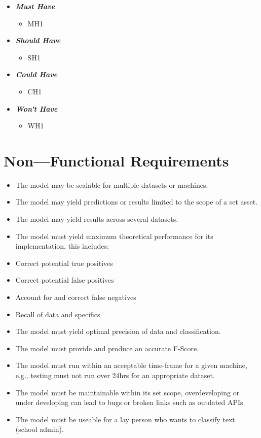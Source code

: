 \begin{itemize}
    \item \textbf{\textit{Must Have}}
        \begin{itemize}\label{FMH}
            \item MH1
        \end{itemize}
    \item \textbf{\textit{Should Have}}
        \begin{itemize}\label{FSH}
            \item SH1
        \end{itemize}
    \item \textbf{\textit{Could Have}}
        \begin{itemize}\label{FCH}
            \item CH1
        \end{itemize}
    \item \textbf{\textit{Won't Have}}
        \begin{itemize}\label{FWH}
            \item WH1
        \end{itemize}
\end{itemize}

\section{Non---Functional Requirements} \label{section:NonFunctionalRequirements}

\begin{itemize}
    \item The model may be scalable for multiple datasets or machines.
    \item The model may yield predictions or results limited to the scope of a set asset.
    \item The model may yield results across several datasets.
    \item The model must yield maximum theoretical performance for its implementation, this includes:
    \item Correct potential true positives
    \item Correct potential false positives
    \item Account for and correct false negatives
    \item Recall of data and specifics
    \item The model must yield optimal precision of data and classification.
    \item The model must provide and produce an accurate F-Score.
    \item The model must run within an acceptable time-frame for a given machine, e.g., testing must not run over 24hrs for an appropriate dataset.
    \item The model must be maintainable within its set scope, overdeveloping or under developing can lead to bugs or broken links such as outdated APIs.
    \item The model must be useable for a lay person who wants to classify text (school admin).
\end{itemize}

